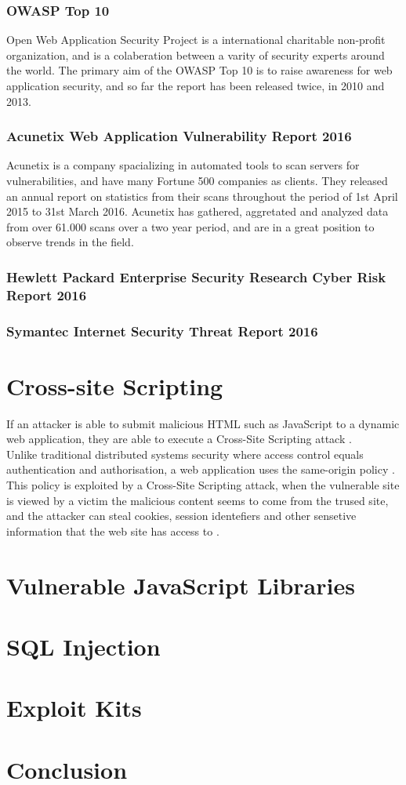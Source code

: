 \subsubsection{OWASP Top 10}
Open Web Application Security Project is a international charitable non-profit organization, and is a colaberation between a varity of security experts around the world. The primary aim of the OWASP Top 10 is to raise awareness for web application security, and so far the report has been released twice, in 2010 and 2013.
\subsubsection{Acunetix Web Application Vulnerability Report 2016}
Acunetix is a company spacializing in automated tools to scan servers for vulnerabilities, and have many Fortune 500 companies as clients. They released an annual report on statistics from their scans throughout the period of 1st April 2015 to 31st March 2016. Acunetix has gathered, aggretated and analyzed data from over 61.000 scans over a two year period, and are in a great position to observe trends in the field. 
\subsubsection{Hewlett Packard Enterprise Security Research Cyber Risk Report 2016}
\subsubsection{Symantec Internet Security Threat Report 2016}
\section{Cross-site Scripting}
If an attacker is able to submit malicious HTML such as JavaScript to a dynamic web application, they are able to execute a Cross-Site Scripting attack \cite{Kirda2011}. \\
Unlike traditional distributed systems security where access control equals authentication and authorisation, a web application uses the same-origin policy \cite{Gollmann2011}. This policy is exploited by a Cross-Site Scripting attack, when the vulnerable site is viewed by a victim the malicious content seems to come from the trused site, and the attacker can steal cookies, session identefiers and other sensetive information that the web site has access to \cite{Kirda2011}.
\section{Vulnerable JavaScript Libraries}
\section{SQL Injection}
\section{Exploit Kits}
\section{Conclusion}



